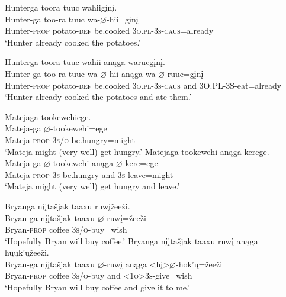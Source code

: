\documentclass[output=paper]{LSP/langsci}
\begin{document}
\begin{exe}
\ex\label{ex:jrs:32}
\begin{xlist}  
\ex
\glll Hunterga 	toora 	tuuc 	wahiig\k{i}n\k{i}. \\
Hunter-ga 	too-ra 	tuuc 	wa-$\varnothing$-hii=g\k{i}n\k{i} \\
	Hunter-\textsc{prop} potato-\textsc{def} 	be.cooked 	\textsc{3o.pl-3s-caus}=already \\
\trans `Hunter already cooked the potatoes.' 

\ex
\glll Hunterga  	toora 		tuuc 		wahii 	anąga 	warucg\k{i}n\k{i}. \\
Hunter-ga  too-ra	tuuc 	wa-$\varnothing$-hii 	 anąga wa-$\varnothing$-ruuc=g\k{i}n\k{i} \\
Hunter-\textsc{prop} potato-\textsc{def} 	be.cooked	 \textsc{3o.pl-3s-caus} and 3O.PL-3S-eat=already\\
`Hunter already cooked the potatoes and ate them.'
\end{xlist}
\ex\label{ex:jrs:33}
\begin{xlist} 
\ex
\glll Matejaga 	tookewehiege. \\
Mateja-ga 	$\varnothing$-tookewehi=ege \\
	Mateja-\textsc{prop} 	\textsc{3s/o}-be.hungry=might \\
\trans `Mateja might (very well) get hungry.' 
\ex
\glll Matejaga 			tookewehi 		anąga 	kerege. \\
Mateja-ga 			$\varnothing$-tookewehi 	anąga 	$\varnothing$-kere=ege  \\
Mateja-\textsc{prop} 	\textsc{3s}-be.hungry and 			\textsc{3s}-leave=might \\
\trans `Mateja might (very well) get hungry and leave.'
\end{xlist}

\ex\label{ex:jrs:34}	
\begin{xlist} 
\ex
\glll Bryanga 			{n\k{i}\k{i}ta\v{s}jak taaxu }	ruw\k{i}\v{z}ee\v{z}i. \\
Bryan-ga 		{n\k{i}\k{i}ta\v{s}jak 	taaxu }	$\varnothing$-ruw\k{i}=\v{z}ee\v{z}i \\
	Bryan-\textsc{prop} 	coffee	\textsc{3s/o}-buy=wish \\
\trans `Hopefully Bryan will buy coffee.' 
\ex
\glll Bryanga 	{n\k{i}\k{i}ta\v{s}jak taaxu }	ruw\k{i} 		anąga 	h\k{u}\k{u}k'\k{u}\v{z}ee\v{z}i. \\
Bryan-ga 	{n\k{i}\k{i}ta\v{s}jak taaxu }	$\varnothing$-ruw\k{i}  	anąga 	<h\k{i}>$\varnothing$-hok'\k{u}=\v{z}ee\v{z}i \\
	Bryan-\textsc{prop} 	coffee 		\textsc{3s/o}-buy		 and 		\textsc{<1o>3s}-give=wish \\
\trans `Hopefully Bryan will buy coffee and give it to me.'
\end{xlist}
\end{exe}	
	
\end{document}
